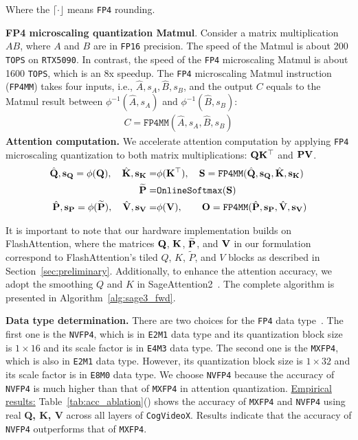 Where the $\lceil \cdot \rfloor$ means \texttt{FP4} rounding.


\textbf{FP4 microscaling quantization Matmul}. Consider a matrix multiplication $AB$, where $A$ and $B$ are in \texttt{FP16} precision. The speed of the Matmul is about 200 \texttt{TOPS} on \texttt{RTX5090}. In contrast, the speed of the \texttt{FP4} microscaling Matmul is about 1600 \texttt{TOPS}, which is an 8x speedup. The \texttt{FP4} microscaling Matmul instruction (\texttt{FP4MM}) takes four inputs, i.e., $\hat A, s_A, \hat B, s_B$, and the output $C$ equals to the Matmul result between $\phi^{-1}(\hat A, s_A)$ and $\phi^{-1}(\hat B, s_B)$:
\begin{align}
    C = \texttt{FP4MM}(\hat A, s_A, \hat B, s_B)
    \label{equ:FP4MM} 
\end{align}
\textbf{Attention computation.} We accelerate attention computation by applying \texttt{FP4} microscaling quantization to both matrix multiplications: $\mathbf{Q}\mathbf{K}^\top$ and $\mathbf{P}\mathbf{V}$. 
\begin{align}
    \hat {\mathbf{Q}}, \mathbf{s_Q} = \phi(\mathbf{Q}), ~~~
    \hat {\mathbf{K}}, \mathbf{s_K} =& \phi(\mathbf{K}^\top), ~~~
    \mathbf{S} = \texttt{FP4MM}(\hat {\mathbf{Q}}, \mathbf{s_Q}, \hat {\mathbf{K}}, \mathbf{s_K})  \notag \\
    \widetilde {\mathbf{P}} =& \texttt{OnlineSoftmax}(\mathbf{S})  \notag \\
    \hat {\mathbf{P}}, \mathbf{s_P} = \phi(\widetilde {\mathbf{P}}), ~~~
    \hat {\mathbf{V}}, \mathbf{s_V} =& \phi(\mathbf{V}), ~~~~~~
    \mathbf{O} = \texttt{FP4MM}(\hat {\mathbf{P}}, \mathbf{s_P}, \hat {\mathbf{V}}, \mathbf{s_V}) 
\end{align}

It is important to note that our hardware implementation builds on FlashAttention, where the matrices $\mathbf{Q}$, $\mathbf{K}$, $\widetilde {\mathbf{P}}$, and $\mathbf{V}$ in our formulation correspond to FlashAttention’s tiled $Q$, $K$, $\widetilde{P}$, and $V$ blocks as described in Section~\ref{sec:preliminary}. Additionally, to enhance the attention accuracy, we adopt the smoothing $Q$ and $K$ in SageAttention2~\citep{zhang2024sageattention2}. The complete algorithm is presented in Algorithm~\ref{alg:sage3_fwd}.


\textbf{Data type determination.} 
There are two choices for the \texttt{FP4} data type~\citep{rouhani2023microscaling}. The first one is the \texttt{NVFP4}, which is in \texttt{E2M1} data type and its quantization block size is $1 \times 16$ and its scale factor is in \texttt{E4M3} data type. The second one is the \texttt{MXFP4}, which is also in \texttt{E2M1} data type. However, its quantization block size is $1 \times 32$ and its scale factor is in \texttt{E8M0} data type. We choose \texttt{NVFP4} 
because the accuracy of \texttt{NVFP4} is much higher than that of \texttt{MXFP4} in attention quantization. \underline{Empirical results:} Table~\ref{tab:acc_ablation}() shows the accuracy of \texttt{MXFP4} and \texttt{NVFP4} using real \textbf{Q, K, V} across all layers of \texttt{CogVideoX}. Results indicate that the accuracy of \texttt{NVFP4} outperforms that of \texttt{MXFP4}.

